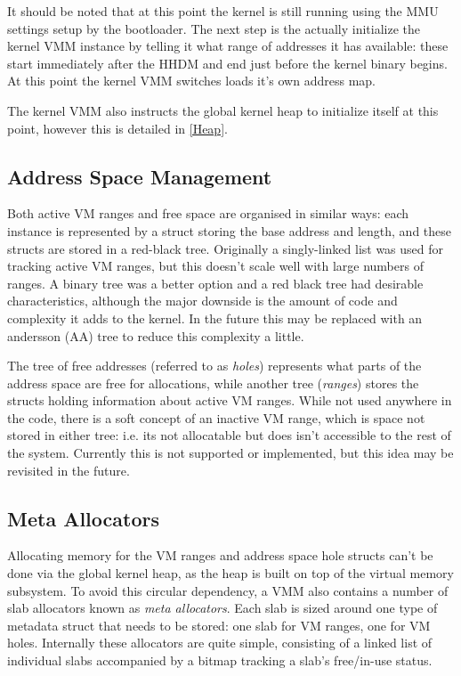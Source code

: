 It should be noted that at this point the kernel is still running using the MMU settings setup by the bootloader. The next step is the actually initialize the kernel VMM instance by telling it what range of addresses it has available: these start immediately after the HHDM and end just before the kernel binary begins. At this point the kernel VMM switches loads it's own address map.

The kernel VMM also instructs the global kernel heap to initialize itself at this point, however this is detailed in \autoref{Heap}.

\subsection{Address Space Management}
Both active VM ranges and free space are organised in similar ways: each instance is represented by a struct storing the base address and length, and these structs are stored in a red-black tree. Originally a singly-linked list was used for tracking active VM ranges, but this doesn't scale well with large numbers of ranges. A binary tree was a better option and a red black tree had desirable characteristics, although the major downside is the amount of code and complexity it adds to the kernel. In the future this may be replaced with an andersson (AA) tree to reduce this complexity a little.

The tree of free addresses (referred to as \textit{holes}) represents what parts of the address space are free for allocations, while another tree (\textit{ranges}) stores the structs holding information about active VM ranges. While not used anywhere in the code, there is a soft concept of an inactive VM range, which is space not stored in either tree: i.e. its not allocatable but does isn't accessible to the rest of the system. Currently this is not supported or implemented, but this idea may be revisited in the future.

\subsection{Meta Allocators}
Allocating memory for the VM ranges and address space hole structs can't be done via the global kernel heap, as the heap is built on top of the virtual memory subsystem. To avoid this circular dependency, a VMM also contains a number of slab allocators known as \textit{meta allocators}. Each slab is sized around one type of metadata struct that needs to be stored: one slab for VM ranges, one for VM holes. Internally these allocators are quite simple, consisting of a linked list of individual slabs accompanied by a bitmap tracking a slab's free/in-use status.

